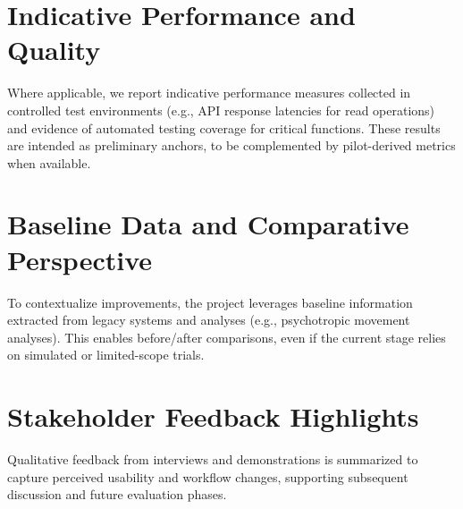 \section{Indicative Performance and Quality}
Where applicable, we report indicative performance measures collected in controlled test environments (e.g., API response latencies for read operations) and evidence of automated testing coverage for critical functions. These results are intended as preliminary anchors, to be complemented by pilot-derived metrics when available.

\section{Baseline Data and Comparative Perspective}
To contextualize improvements, the project leverages baseline information extracted from legacy systems and analyses (e.g., psychotropic movement analyses). This enables before/after comparisons, even if the current stage relies on simulated or limited-scope trials.

\section{Stakeholder Feedback Highlights}
Qualitative feedback from interviews and demonstrations is summarized to capture perceived usability and workflow changes, supporting subsequent discussion and future evaluation phases.


